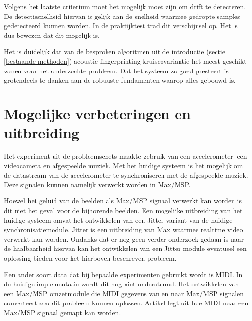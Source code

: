 Volgens het laatste criterium moet het mogelijk moet zijn om drift te detecteren. De detectiesnelheid hiervan is gelijk aan de snelheid waarmee gedropte samples gedetecteerd kunnen worden. In de praktijktest trad dit verschijnsel op. Het is dus bewezen dat dit mogelijk is.

Het is duidelijk dat van de besproken algoritmen uit de introductie (sectie \ref{bestaande-methoden}) acoustic fingerprinting kruiscovariantie het meest geschikt waren voor het onderzochte probleem. Dat het systeem zo goed presteert is grotendeels te danken aan de robuuste fundamenten waarop alles gebouwd is.

\section{Mogelijke verbeteringen en uitbreiding}

Het experiment uit de probleemschets maakte gebruik van een accelerometer, een videocamera en afgespeelde muziek. Met het huidige systeem is het mogelijk om de datastream van de accelerometer te synchroniseren met de afgespeelde muziek. Deze signalen kunnen namelijk verwerkt worden in Max/MSP. 

Hoewel het geluid van de beelden als Max/MSP signaal verwerkt kan worden is dit niet het geval voor de bijhorende beelden. Een mogelijke uitbreiding van het huidige systeem omvat het ontwikkelen van een Jitter variant van de huidige synchronisatiemodule. Jitter is een uitbreiding van Max waarmee realtime video verwerkt kan worden. Ondanks dat er nog geen verder onderzoek gedaan is naar de haalbaarheid hiervan kan het ontwikkelen van een Jitter module eventueel een oplossing bieden voor het hierboven beschreven probleem.

Een ander soort data dat bij bepaalde experimenten gebruikt wordt is MIDI. In de huidige implementatie wordt dit nog niet ondersteund. Het ontwikkelen van een Max/MSP omzetmodule die MIDI gegevens van en naar Max/MSP signalen converteert zou dit probleem kunnen oplossen. Artikel \cite{mspmidi} legt uit hoe MIDI naar een Max/MSP signaal gemapt kan worden.


